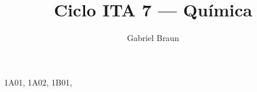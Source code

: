 \documentclass[braun, twocolumn]{braun}
\title{Ciclo ITA 7 --- Química}
\affiliation{Colégio e Curso Pensi, Turma IME-ITA}
\author{Gabriel Braun}
\begin{document}
\maketitle

%                                              
%                                              

\InputDB
{
    1A01, 
    1A02,
    1B01,
}

\makegaba

%                                              
%                                              
\end{document}
